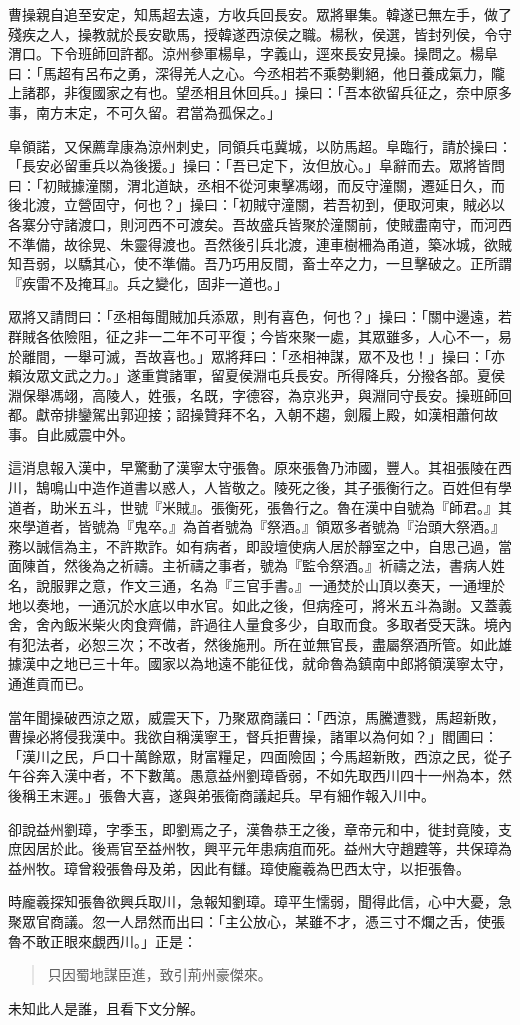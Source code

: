 曹操親自追至安定，知馬超去遠，方收兵回長安。眾將畢集。韓遂已無左手，做了殘疾之人，操教就於長安歇馬，授韓遂西涼侯之職。楊秋，侯選，皆封列侯，令守渭口。下令班師回許都。涼州參軍楊阜，字義山，逕來長安見操。操問之。楊阜曰：「馬超有呂布之勇，深得羌人之心。今丞相若不乘勢剿絕，他日養成氣力，隴上諸郡，非復國家之有也。望丞相且休回兵。」操曰：「吾本欲留兵征之，奈中原多事，南方末定，不可久留。君當為孤保之。」

阜領諾，又保薦韋康為涼州刺史，同領兵屯冀城，以防馬超。阜臨行，請於操曰：「長安必留重兵以為後援。」操曰：「吾已定下，汝但放心。」阜辭而去。眾將皆問曰：「初賊據潼關，渭北道缺，丞相不從河東擊馮翊，而反守潼關，遷延日久，而後北渡，立營固守，何也？」操曰：「初賊守潼關，若吾初到，便取河東，賊必以各寨分守諸渡口，則河西不可渡矣。吾故盛兵皆聚於潼關前，使賊盡南守，而河西不準備，故徐晃、朱靈得渡也。吾然後引兵北渡，連車樹柵為甬道，築冰城，欲賊知吾弱，以驕其心，使不準備。吾乃巧用反間，畜士卒之力，一旦擊破之。正所謂『疾雷不及掩耳』。兵之變化，固非一道也。」

眾將又請問曰：「丞相每聞賊加兵添眾，則有喜色，何也？」操曰：「關中邊遠，若群賊各依險阻，征之非一二年不可平復；今皆來聚一處，其眾雖多，人心不一，易於離間，一舉可滅，吾故喜也。」眾將拜曰：「丞相神謀，眾不及也！」操曰：「亦賴汝眾文武之力。」遂重賞諸軍，留夏侯淵屯兵長安。所得降兵，分撥各部。夏侯淵保舉馮翊，高陵人，姓張，名既，字德容，為京兆尹，與淵同守長安。操班師回都。獻帝排鑾駕出郭迎接；詔操贊拜不名，入朝不趨，劍履上殿，如漢相蕭何故事。自此威震中外。

這消息報入漢中，早驚動了漢寧太守張魯。原來張魯乃沛國，豐人。其祖張陵在西川，鵠鳴山中造作道書以惑人，人皆敬之。陵死之後，其子張衡行之。百姓但有學道者，助米五斗，世號『米賊』。張衡死，張魯行之。魯在漢中自號為『師君。』其來學道者，皆號為『鬼卒。』為首者號為『祭酒。』領眾多者號為『治頭大祭酒。』務以誠信為主，不許欺詐。如有病者，即設壇使病人居於靜室之中，自思己過，當面陳首，然後為之祈禱。主祈禱之事者，號為『監令祭酒。』祈禱之法，書病人姓名，說服罪之意，作文三通，名為『三官手書。』一通焚於山頂以奏天，一通埋於地以奏地，一通沉於水底以申水官。如此之後，但病痊可，將米五斗為謝。又蓋義舍，舍內飯米柴火肉食齊備，許過往人量食多少，自取而食。多取者受天誅。境內有犯法者，必恕三次；不改者，然後施刑。所在並無官長，盡屬祭酒所管。如此雄據漢中之地已三十年。國家以為地遠不能征伐，就命魯為鎮南中郎將領漢寧太守，通進貢而已。

當年聞操破西涼之眾，威震天下，乃聚眾商議曰：「西涼，馬騰遭戮，馬超新敗，曹操必將侵我漢中。我欲自稱漢寧王，督兵拒曹操，諸軍以為何如？」閻圃曰：「漢川之民，戶口十萬餘眾，財富糧足，四面險固；今馬超新敗，西涼之民，從子午谷奔入漢中者，不下數萬。愚意益州劉璋昏弱，不如先取西川四十一州為本，然後稱王末遲。」張魯大喜，遂與弟張衛商議起兵。早有細作報入川中。

卻說益州劉璋，字季玉，即劉焉之子，漢魯恭王之後，章帝元和中，徙封竟陵，支庶因居於此。後焉官至益州牧，興平元年患病疽而死。益州大守趙韙等，共保璋為益州牧。璋曾殺張魯母及弟，因此有讎。璋使龐羲為巴西太守，以拒張魯。

時龐羲探知張魯欲興兵取川，急報知劉璋。璋平生懦弱，聞得此信，心中大憂，急聚眾官商議。忽一人昂然而出曰：「主公放心，某雖不才，憑三寸不爛之舌，使張魯不敢正眼來覷西川。」正是：

\begin{quote}
只因蜀地謀臣進，致引荊州豪傑來。
\end{quote}

未知此人是誰，且看下文分解。
